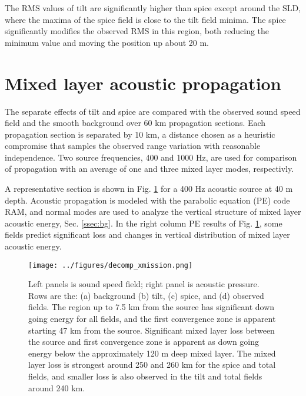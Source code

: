 \documentclass[preprint,NumberedRefs]{JASA}
\begin{document}
The RMS values of tilt are significantly higher than spice except around the SLD, where the maxima of the spice field is close to the tilt field minima. The spice significantly modifies the observed RMS in this region, both reducing the minimum value and moving the position up about 20 m.

\section{\label{sec:propagation}Mixed layer acoustic propagation}
The separate effects of tilt and spice are compared with the observed sound speed field and the smooth background over 60 km propagation sections. Each propagation section is separated by 10 km, a distance chosen as a heuristic compromise that samples the observed range variation with reasonable independence. Two source frequencies, 400 and 1000 Hz, are used for comparison of propagation with an average of one and three mixed layer modes, respectivly.

A representative section is shown in Fig. \ref{fig:decomp_x} for a 400 Hz acoustic source at 40 m depth. Acoustic propagation is modeled with the parabolic equation (PE) code RAM\citep{collins93}, and normal modes are used to analyze the vertical structure of mixed layer acoustic energy, Sec. \ref{ssec:bg}. In the right column PE results of Fig. \ref{fig:decomp_x}, some fields predict significant loss and changes in vertical distribution of mixed layer acoustic energy.

\begin{figure}
\texttt{[image: ../figures/decomp\_xmission.png]}
    \caption{\label{fig:decomp_x}{Left panels is sound speed field; right panel is acoustic pressure. Rows are the: (a) background (b) tilt, (c) spice, and (d) observed fields. The region up to 7.5 km from the source has significant down going energy for all fields, and the first convergence zone is apparent starting 47 km from the source. Significant mixed layer loss between the source and first convergence zone is apparent as down going energy below the approximately 120 m deep mixed layer. The mixed layer loss is strongest around 250 and 260 km for the spice and total fields, and smaller loss is also observed in the tilt and total fields around 240 km.}}
\end{figure}
\end{document}
